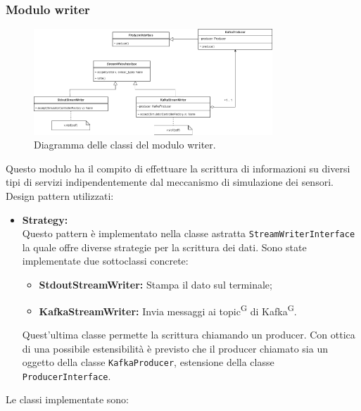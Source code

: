 \documentclass[8pt]{article}
\newcommand{\glossterm}[1]{#1\textsuperscript{G}} %
\begin{document}
\subsubsection{Modulo writer}
\begin{figure}[h!]
    \centering
    \includegraphics[width=0.8\textwidth]{images_st/writer.png}
    \caption{Diagramma delle classi del modulo writer.}
    \label{fig:Diagramma delle classi del modulo writer}
\end{figure}
Questo modulo ha il compito di effettuare la scrittura di informazioni su diversi tipi di servizi indipendentemente dal meccanismo di simulazione dei sensori.
Design pattern utilizzati: 
\begin{itemize}
	\setlength\itemsep{0em}
    \item \textbf{Strategy:} 
    \\Questo pattern è implementato nella classe astratta \verb|StreamWriterInterface| la quale offre diverse strategie per la scrittura dei dati. Sono state implementate due sottoclassi concrete:
    \begin{itemize}
	\setlength\itemsep{0em}
        \item \textbf{StdoutStreamWriter:} Stampa il dato sul terminale;
        \item \textbf{KafkaStreamWriter:} Invia messaggi ai \glossterm{topic} di \glossterm{Kafka}. 
    \end{itemize}
    Quest'ultima classe permette la scrittura chiamando un producer. Con ottica di una possibile estensibilità è previsto che il producer chiamato sia un oggetto della classe \verb|KafkaProducer|, estensione della classe \verb|ProducerInterface|.
\end{itemize}
Le classi implementate sono:
\end{document}
